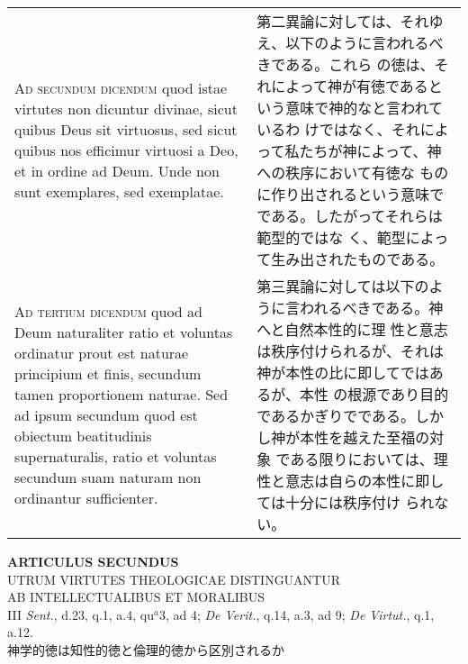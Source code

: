 \documentclass[10pt]{jsarticle}
\begin{document}
\begin{longtable}{p{21em}p{21em}}
\\



{\scshape Ad secundum dicendum} quod istae virtutes non dicuntur
divinae, sicut quibus Deus sit virtuosus, sed sicut quibus nos
efficimur virtuosi a Deo, et in ordine ad Deum. Unde non sunt
exemplares, sed exemplatae.

&

 第二異論に対しては、それゆえ、以下のように言われるべきである。これら
 の徳は、それによって神が有徳であるという意味で神的なと言われているわ
 けではなく、それによって私たちが神によって、神への秩序において有徳な
 ものに作り出されるという意味でである。したがってそれらは範型的ではな
 く、範型によって生み出されたものである。
 
\\



{\scshape Ad tertium dicendum} quod ad Deum naturaliter ratio et
voluntas ordinatur prout est naturae principium et finis, secundum
tamen proportionem naturae. Sed ad ipsum secundum quod est obiectum
beatitudinis supernaturalis, ratio et voluntas secundum suam naturam
non ordinantur sufficienter.

&

第三異論に対しては以下のように言われるべきである。神へと自然本性的に理
性と意志は秩序付けられるが、それは神が本性の比に即してではあるが、本性
の根源であり目的であるかぎりでである。しかし神が本性を越えた至福の対象
である限りにおいては、理性と意志は自らの本性に即しては十分には秩序付け
られない。


\end{longtable}
\newpage

\begin{center}
{\Large {\bf ARTICULUS SECUNDUS}}\\
{\large UTRUM VIRTUTES THEOLOGICAE DISTINGUANTUR\\ AB INTELLECTUALIBUS ET MORALIBUS}\\
{\footnotesize III {\itshape Sent.}, d.23, q.1, a.4, qu$^{a}$3, ad 4; {\itshape De Verit.}, q.14, a.3, ad 9; {\itshape De Virtut.}, q.1, a.12.}\\
{\Large 神学的徳は知性的徳と倫理的徳から区別されるか\\}
\end{center}
\end{document}
